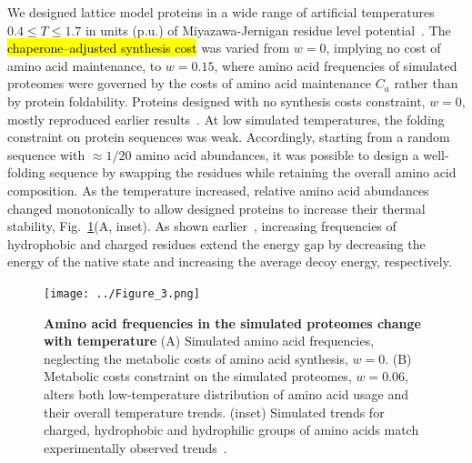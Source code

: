 \documentclass[10pt,letterpaper]{article}
\begin{document}
We designed lattice model proteins in a wide range of artificial temperatures $0.4\leq T\leq 1.7$ in units (p.u.) of Miyazawa-Jernigan residue level potential~\cite{Miyazawa1999SelfConsistent}. The \hl{chaperone--adjusted synthesis cost} was varied from $w=0$, implying no cost of amino acid maintenance, to $w=0.15$, where amino acid frequencies of simulated proteomes were governed by the costs of amino acid maintenance $C_{a}$ rather than by protein foldability. Proteins designed with no synthesis costs constraint, $w=0$, mostly reproduced earlier results~\cite{Berezovsky2007Positive,Venev2015Massively}.
At low simulated temperatures, the folding constraint on protein sequences was weak. Accordingly, starting from a random sequence with $\approx 1/20$ amino acid abundances, it was possible to design a well-folding sequence by swapping the residues while retaining the overall amino acid composition.  As the temperature increased, relative amino acid abundances changed monotonically to allow designed proteins to increase their thermal stability, Fig.~\ref{fig:fig3}(A, inset). As shown earlier~\cite{Berezovsky2007Positive}, increasing frequencies of hydrophobic and charged residues extend the energy gap by decreasing the energy of the native state and increasing the average decoy energy, respectively. 


\begin{figure}[h!]
\texttt{[image: ../Figure\_3.png]}
\caption{
{\bf Amino acid frequencies in the simulated proteomes change with temperature} (A) Simulated amino acid frequencies, neglecting the metabolic costs of amino acid synthesis, $w=0$.  (B) Metabolic costs constraint on the simulated proteomes, $w=0.06$, alters both low-temperature distribution of amino acid usage and their overall temperature trends. (inset) Simulated trends for charged, hydrophobic and hydrophilic groups of amino acids match experimentally observed trends~\cite{Berezovsky2007Positive}.
}
\label{fig:fig3}
\end{figure}
\end{document}
